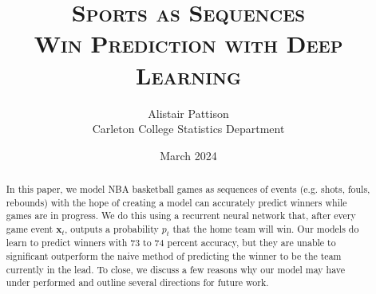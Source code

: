 \documentclass{article}
\title{\scshape
	Sports as Sequences \\[1em]
	\large Win Prediction with Deep Learning
}
\author{Alistair Pattison \\ {\small Carleton College Statistics Department}}
\date{March 2024}
\begin{document}
\maketitle

\vspace{1in}

\tableofcontents
\thispagestyle{empty}

\newpage

\pagestyle{fancy}
\setcounter{page}{1}

\begin{abstract}
	In this paper, we model NBA basketball games as sequences of events (e.g. shots, fouls, rebounds) with the hope of creating a model can accurately predict winners while games are in progress. We do this using a recurrent neural network that, after every game event $\mathbf x_t$, outputs a probability $p_t$ that the home team will win. Our models do learn to predict winners with 73 to 74 percent accuracy, but they are unable to significant outperform the naive method of predicting the winner to be the team currently in the lead. To close, we discuss a few reasons why our model may have under performed and outline several directions for future work.
\end{abstract}








\clearpage

\nocite{ISL, ESL}

\printbibliography
\end{document}
